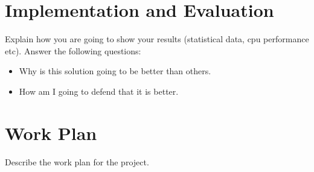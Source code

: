 
% 
% 
\section{Implementation and Evaluation}

Explain how you are going to show your results (statistical data, cpu performance etc). Answer the following questions:
\begin{itemize}
  \item Why is this solution going to be better than others.
  \item How am I going to defend that it is better.
\end{itemize}

\section{Work Plan}

Describe the work plan for the project.